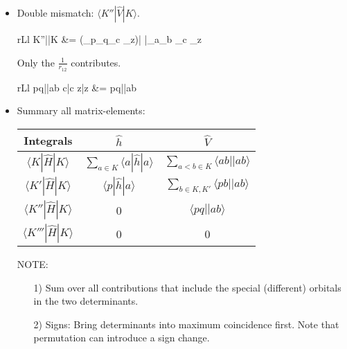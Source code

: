 \documentclass[a4paper, 12pt]{article}
\begin{document}
\begin{itemize}
	\item Double mismatch: $\langle K''|\hat{V}|K\rangle$.
	 \begin{IEEEeqnarray}{rLl}
\langle K''||K \rangle &=  \langle {} (\psi_p\psi_q\psi_c \cdots \psi_z)| |\psi_a\psi_b \psi_c \cdots \psi_z\rangle  
	\end{IEEEeqnarray}
Only the $\frac{1}{r_{12}}$ contributes.
	 \begin{IEEEeqnarray}{rLl}
\langle pq||ab \rangle  \langle c|c \rangle \cdots \langle z|z \rangle &=  \langle pq||ab \rangle
	\end{IEEEeqnarray}


\end{itemize}


\begin{summary}{}{}
\begin{itemize}
	\item Summary all matrix-elements:
\begin{center}
\begin{tabular}{|c|c|c|} 
\hline 
Integrals & $\hat{h}$ & $\hat{V}$ \\
\hline  
$\langle K|\hat{H}|K \rangle$ & $\sum_{a\in K} \langle a|\hat{h}|a \rangle$ & $\sum_{a<b \in K} \langle ab||ab \rangle$\\
\hline  
$\langle K'|\hat{H}|K \rangle$  & $ \langle p|\hat{h}|a \rangle$ & $\sum_{b \in K,K'} \langle pb||ab \rangle$\\
\hline  
$\langle K''|\hat{H}|K \rangle$  & 0 &$ \langle pq||ab \rangle$\\
\hline
$\langle K'''|\hat{H}|K \rangle$  &   0& 0\\
\hline
\end{tabular}
\end{center}
\tab NOTE: 
\begin{itemize}
\item[1)] Sum over all contributions that include the special (different) orbitals in the two determinants.
\item[2)] Signs: Bring determinants into maximum coincidence first. Note that permutation can introduce a sign change.
\end{itemize}
\end{itemize}

\end{summary}
\end{document}

